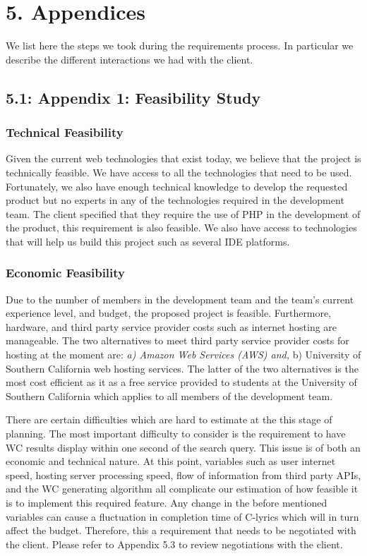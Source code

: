\documentclass[]{article}
\begin{document}
\section{5. Appendices}\label{appendices}

We list here the steps we took during the requirements process. In
particular we describe the different interactions we had with the
client.

\subsection{5.1: Appendix 1: Feasibility
Study}\label{appendix-1-feasibility-study}

\subsubsection{Technical Feasibility}\label{technical-feasibility}

Given the current web technologies that exist today, we believe that the
project is technically feasible. We have access to all the technologies
that need to be used. Fortunately, we also have enough technical
knowledge to develop the requested product but no experts in any of the
technologies required in the development team. The client specified that
they require the use of PHP in the development of the product, this
requirement is also feasible. We also have access to technologies that
will help us build this project such as several IDE platforms.

\subsubsection{Economic Feasibility}\label{economic-feasibility}

Due to the number of members in the development team and the team's
current experience level, and budget, the proposed project is feasible.
Furthermore, hardware, and third party service provider costs such as
internet hosting are manageable. The two alternatives to meet third
party service provider costs for hosting at the moment are: \emph{a)
Amazon Web Services (AWS) and, }b) University of Southern California web
hosting services. The latter of the two alternatives is the most cost
efficient as it as a free service provided to students at the University
of Southern California which applies to all members of the development
team.

There are certain difficulties which are hard to estimate at the this
stage of planning. The most important difficulty to consider is the
requirement to have WC results display within one second of the search
query. This issue is of both an economic and technical nature. At this
point, variables such as user internet speed, hosting server processing
speed, flow of information from third party APIs, and the WC generating
algorithm all complicate our estimation of how feasible it is to
implement this required feature. Any change in the before mentioned
variables can cause a fluctuation in completion time of C-lyrics which
will in turn affect the budget. Therefore, this a requirement that needs
to be negotiated with the client. Please refer to Appendix 5.3 to review
negotiations with the client.
\end{document}
